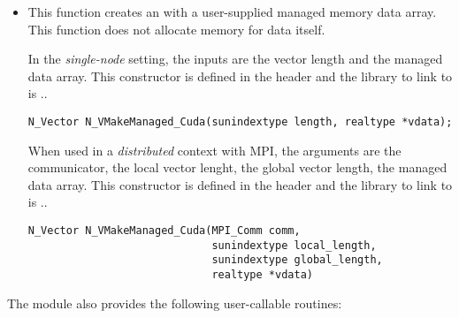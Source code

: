 \begin{itemize}

\item {}

  This function creates an {\nveccuda} with a user-supplied managed memory data
  array. This function does not allocate memory for data itself.
  
  In the \textit{single-node} setting, the inputs are the vector length and the
  managed data array. This constructor is defined in the header
   and the library to link to is
  ..

\begin{verbatim}
N_Vector N_VMakeManaged_Cuda(sunindextype length, realtype *vdata);
\end{verbatim}

  When used in a \textit{distributed} context with MPI, the arguments are the
  {\mpi} communicator, the local vector lenght, the global vector length, the
  managed data array. This constructor is defined in the header
   and the library to link to is 
  ..

\begin{verbatim}
N_Vector N_VMakeManaged_Cuda(MPI_Comm comm,
                             sunindextype local_length,
                             sunindextype global_length,
                             realtype *vdata)
\end{verbatim}


\end{itemize}
The module {\nveccuda} also provides the following user-callable routines:
